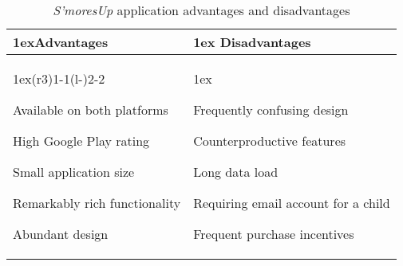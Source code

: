 \begin{table}[htb]
\begin{tabularx}{\linewidth}{>{\parskip1ex}X@{\kern4\tabcolsep}>{\parskip1ex}X}
\toprule
\hfil\bfseries Advantages
&
\hfil\bfseries Disadvantages
\\
\cmidrule(r{3\tabcolsep}){1-1}\cmidrule(l{-\tabcolsep}){2-2}

Available on both platforms\par
High Google Play rating\par
Small application size\par
Remarkably rich functionality\par
Abundant design\par

&

\par
Frequently confusing design\par
Counterproductive features\par
Long data load\par
Requiring email account for a child\par
Frequent purchase incentives

\\
\bottomrule
\end{tabularx}
\caption{\textit{S'moresUp} application advantages and disadvantages}
\label{tab:applications:smoresup}
\end{table}